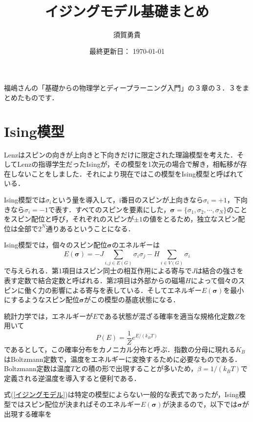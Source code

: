 \documentclass[a4paper,11pt]{jsarticle}
\begin{document}
\title{イジングモデル基礎まとめ}
\author{須賀勇貴}
\date{最終更新日： \today}
\maketitle

福嶋さんの「基礎からの物理学とディープラーニング入門」の３章の３．３をまとめたものです．\par

\section*{Ising模型}
Lenzはスピンの向きが上向きと下向きだけに限定された理論模型を考えた．そしてLenzの指導学生だったIsingが，その模型を1次元の場合で解き，相転移が存在しないことをしました．それにより現在ではこの模型をIsing模型と呼ばれている．\par
Ising模型では$\sigma_i$という量を導入して，i番目のスピンが上向きなら$\sigma_i = +1$，下向きなら$\sigma_i = -1$で表す．すべてのスピンを要素にした，$\bm{\sigma}=\{ \sigma_1, \sigma_2, \cdots, \sigma_N \}$のことをスピン配位と呼び，それぞれのスピンが$\pm 1$の値をとるため，独立なスピン配位は全部で$2^N$通りあるということになる．\par
Ising模型では，個々のスピン配位$\bm{\sigma}$のエネルギーは
\begin{equation}
  E(\bm{\sigma}) = -J\sum_{i,j \in E(G)}\sigma_i \sigma_j -H \sum_{i \in V(G)} \sigma_i
\end{equation}
で与えられる．第1項目はスピン同士の相互作用による寄与で$J$は結合の強さを表す定数で結合定数と呼ばれる．第2項目は外部からの磁場$H$によって個々のスピンに働く力の影響による寄与を表している．そしてエネルギー$E(\bm{\sigma})$を最小にするようなスピン配位$\bm{\sigma}$がこの模型の基底状態になる．\par
統計力学では，エネルギーが$E$である状態が混ざる確率を適当な規格化定数$Z$を用いて
\begin{equation}
  P(E) = \frac{1}{Z}e^{E/(k_B T)} \label{イジングモデル}
\end{equation}
であるとして，この確率分布をカノニカル分布と呼ぶ．指数の分母に現れる$K_B$はBoltzmann定数で，温度をエネルギーに変換するために必要なものである．Boltzmann定数は温度$T$との積の形で出現することが多いため，$\beta = 1/(k_B T)$で定義される逆温度を導入すると便利である．\par
式(\ref{イジングモデル})は特定の模型によらない一般的な表式であったが，Ising模型ではスピン配位が決まればそのエネルギー$E(\bm{\sigma})$が決まるので，以下では$\bm{\sigma}$が出現する確率を
\end{document}
